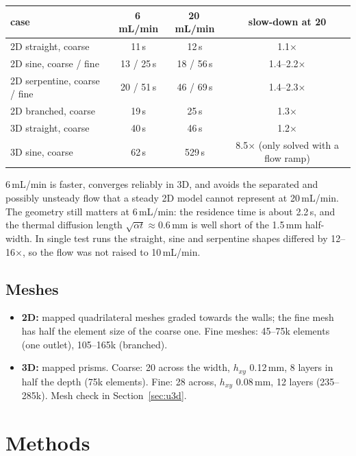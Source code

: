 \documentclass[11pt,a4paper]{article}
\newcommand{\mm}{\ensuremath{\,\mathrm{mm}}}
\begin{document}
\begin{table}[H]
\centering\small
\begin{tabular}{@{}lccc@{}}
\toprule
case & 6\,mL/min & 20\,mL/min & slow-down at 20 \\
\midrule
2D straight, coarse & 11\,s & 12\,s & 1.1$\times$ \\
2D sine, coarse / fine & 13 / 25\,s & 18 / 56\,s & 1.4--2.2$\times$ \\
2D serpentine, coarse / fine & 20 / 51\,s & 46 / 69\,s & 1.4--2.3$\times$ \\
2D branched, coarse & 19\,s & 25\,s & 1.3$\times$ \\
3D straight, coarse & 40\,s & 46\,s & 1.2$\times$ \\
3D sine, coarse & 62\,s & 529\,s & 8.5$\times$ (only solved with a flow ramp) \\
\bottomrule
\end{tabular}
\end{table}

6\,mL/min is faster, converges reliably in 3D, and avoids the separated and possibly unsteady
flow that a steady 2D model cannot represent at 20\,mL/min. The geometry still matters at
6\,mL/min: the residence time is about 2.2\,s, and the thermal diffusion length
$\sqrt{\alpha t} \approx 0.6\mm$ is well short of the 1.5\mm{} half-width. In single test
runs the straight, sine and serpentine shapes differed by 12--16$\times$, so the flow was
not raised to 10\,mL/min.

\subsection{Meshes}
\begin{itemize}
  \item \textbf{2D:} mapped quadrilateral meshes graded towards the walls; the fine mesh has half the
        element size of the coarse one. Fine meshes: 45--75k elements (one outlet), 105--165k (branched).
  \item \textbf{3D:} mapped prisms. Coarse: 20 across the width, $h_{xy}$ 0.12\mm, 8 layers in half
        the depth (75k elements). Fine: 28 across, $h_{xy}$ 0.08\mm, 12 layers (235--285k).
        Mesh check in Section~\ref{sec:u3d}.
\end{itemize}

\section{Methods}
\end{document}
